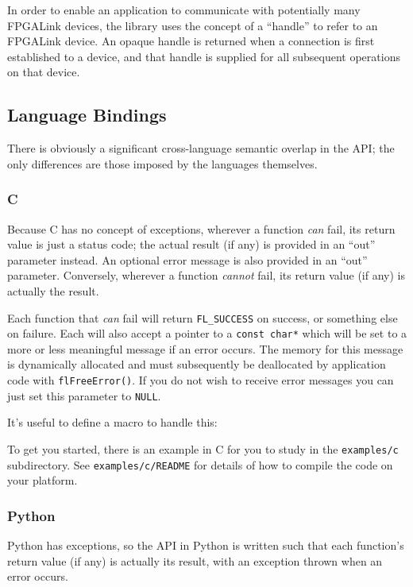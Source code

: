 In order to enable an application to communicate with potentially many FPGALink devices, the library uses the concept of a ``handle'' to refer to an FPGALink device. An opaque handle is returned when a connection is first established to a device, and that handle is supplied for all subsequent operations on that device.

\subsection{Language Bindings}
There is obviously a significant cross-language semantic overlap in the API; the only differences are those imposed by the languages themselves.

\subsubsection{C}
Because C has no concept of exceptions, wherever a function \textit{can} fail, its return value is just a status code; the actual result (if any) is provided in an ``out'' parameter instead. An optional error message is also provided in an ``out'' parameter. Conversely, wherever a function \textit{cannot} fail, its return value (if any) is actually the result.

Each function that \textit{can} fail will return \texttt{FL\_SUCCESS} on success, or something else on failure. Each will also accept a pointer to a \texttt{const char*} which will be set to a more or less meaningful message if an error occurs. The memory for this message is dynamically allocated and must subsequently be deallocated by application code with \texttt{flFreeError()}. If you do not wish to receive error messages you can just set this parameter to \texttt{NULL}.

It's useful to define a macro to handle this:


To get you started, there is an example in C for you to study in the \texttt{examples/c} subdirectory. See \texttt{examples/c/README} for details of how to compile the code on your platform.

\subsubsection{Python}
Python has exceptions, so the API in Python is written such that each function's return value (if any) is actually its result, with an exception thrown when an error occurs.

